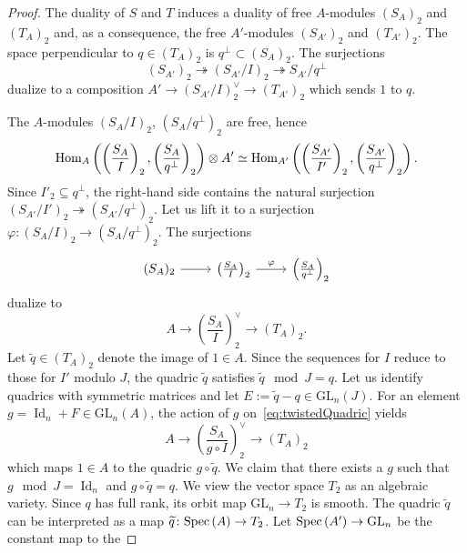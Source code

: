 \documentclass{amsart}
\newcommand{\Spec}{{\rm{Spec}}\,}
\newcommand{\Hom}{{\rm{Hom}}}
\newcommand{\onto}{\twoheadrightarrow}
\DeclareMathOperator{\Id}{Id}
\newcommand{\GL}{\mathrm{GL}}%
\begin{document}
\newcommand{\qtilde}{\widetilde{q}}
\begin{proof}
    The duality of $S$ and $T$ induces a duality of free $A$-modules $(S_A)_2$
    and $(T_A)_2$ and, as a consequence, the free $A'$-modules $(S_{A'})_2$
    and $(T_{A'})_2$.
    The space perpendicular to $q\in (T_A)_2$ is
   $q^\perp\subset (S_A)_2$.
    The surjections 
    $$(S_{A'})_2\onto (S_{A'}/I)_2 \onto S_{A'}/q^\perp$$ dualize
    to a composition $A'\to (S_{A'}/I)_2^{\vee} \to (T_{A'})_2$ which sends
    $1$ to $q$.

    The $A$-modules $(S_A/I)_2$, $(S_A/q^\perp)_2$ are free, hence
    \[
        \Hom_{A}\left(\left(\frac{S_A}{I}\right)_2,
        \left(\frac{S_A}{q^\perp}\right)_2\right)\otimes A' \simeq
        \Hom_{A'}\left(\left(\frac{S_{A'}}{I'}\right)_2,
        \left(\frac{S_{A'}}{q^\perp}\right)_2\right).
    \]
    Since $I'_2 \subseteq q^\perp$,
    the right-hand side contains the natural surjection $(S_{A'}/I')_2\onto
    (S_{A'}/q^\perp)_2$. Let us lift it to a surjection $\varphi\colon
    (S_A/I)_2\to (S_A/q^\perp)_2$. The surjections
    \[
        \begin{tikzcd}
            (S_A)_2 \ar[r] & \left(\frac{S_A}{I}\right)_2 \ar[r, "\varphi"] &
            \left(\frac{S_A}{q^\perp}\right)_2
        \end{tikzcd}
    \]
    dualize to
    \begin{equation}\label{eq:twistedQuadric}
        A \to \left(\frac{S_A}{I}\right)^{\vee}_2 \to (T_A)_2.
    \end{equation}
    Let $\qtilde\in (T_A)_2$ denote the image of $1\in A$. Since the sequences
    for $I$ reduce to those for $I'$ modulo $J$, the quadric $\qtilde$
    satisfies $\qtilde \mod J =
    q$. Let us identify quadrics with symmetric matrices and let $E :=
    \qtilde - q \in \GL_n(J)$. For an element $g = \Id_n + F\in \GL_n(A)$,
    the action of $g$ on~\eqref{eq:twistedQuadric} yields
    \begin{equation}\label{eq:liftedQuadric}
        A \to \left(\frac{S_A}{g\circ I}\right)^{\vee}_2 \to (T_A)_2
    \end{equation}
    which maps $1\in A$ to the quadric $g\circ \qtilde$.
    We claim that there exists a $g$ such that $g\mod J = \Id_n$ and $g\circ \qtilde = q$.
    We view the vector space $T_2$ as an algebraic variety.
    Since $q$ has full rank, its orbit map $\GL_n\to T_2$ is smooth. The quadric $\qtilde$ can be interpreted as a map
    $\qtilde\colon \Spec(A)\to T_2$. Let $\Spec(A')\to \GL_n$ be the constant map to the

\end{proof}
\end{document}
